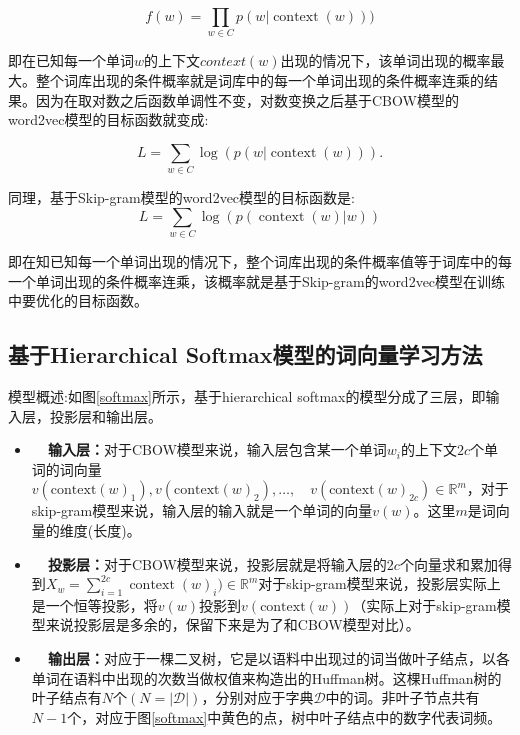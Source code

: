 \begin{equation}
f ( w ) = \prod _ { w \in C } p ( w | \operatorname { context } ( w ) ) )
\end{equation}

即在已知每一个单词$w$的上下文$context(w)$出现的情况下，该单词出现的概率最大。整个词库出现的条件概率就是词库中的每一个单词出现的条件概率连乘的结果。因为在取对数之后函数单调性不变，对数变换之后基于CBOW模型的word2vec模型的目标函数就变成:

\begin{equation}
L = \sum _ { w \in C } \log \left( p \left( w | \operatorname { context } \left( w \right) \right) \right). 
\end{equation}

同理，基于Skip-gram模型的word2vec模型的目标函数是:
\begin{equation}
L = \sum _ { w \in C } \log \left( p \left( \operatorname { context } \left( w \right) | w \right) \right)
\end{equation}

即在知已知每一个单词出现的情况下，整个词库出现的条件概率值等于词库中的每一个单词出现的条件概率连乘，该概率就是基于Skip-gram的word2vec模型在训练中要优化的目标函数。

\subsection{基于Hierarchical Softmax模型的词向量学习方法}

模型概述:如图\ref{softmax}所示，基于hierarchical softmax的模型分成了三层，即输入层，投影层和输出层。
\begin{itemize}
    \item \textbf{~~输入层：}对于CBOW模型来说，输入层包含某一个单词$w_i$的上下文$2c$个单词的词向量$v \left( \text {context} ( w ) _ { 1 } \right) , v \left( \text {context} ( w ) _ { 2 } \right) , \ldots , \quad v \left( \text {context} ( w ) _ { 2 c } \right) \in \mathbb { R } ^ { m }$，对于 skip-gram模型来说，输入层的输入就是一个单词的向量$v(w)$。这里$m$是词向量的维度(长度)。
    \item \textbf{~~投影层：}对于CBOW模型来说，投影层就是将输入层的$2c$个向量求和累加得到$X _ { w } = \sum _ { i = 1 } ^ { 2 c } \operatorname { context } ( w ) _ { i } ) \in \mathbb { R } ^ { m }$对于skip-gram模型来说，投影层实际上是一个恒等投影，将$v(w)$投影到$v(\text{context}(w))$（实际上对于skip-gram模型来说投影层是多余的，保留下来是为了和CBOW模型对比）。
    \item \textbf{~~输出层：}对应于一棵二叉树，它是以语料中出现过的词当做叶子结点，以各单词在语料中出现的次数当做权值来构造出的Huffman树。这棵Huffman树的叶子结点有$N$个$(N=|\mathcal{D}|)$，分别对应于字典$\mathcal{D}$中的词。非叶子节点共有$N-1$个，对应于图\ref{softmax}中黄色的点，树中叶子结点中的数字代表词频。
\end{itemize}

